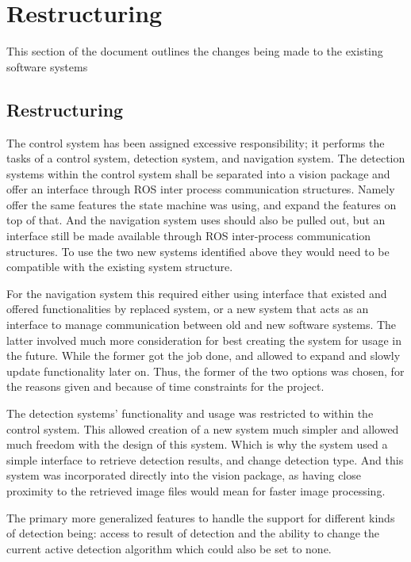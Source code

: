 
\chapter{Restructuring} %

\label{Chapter4} %

This section of the document outlines the changes being made to the existing software systems 


\section{Restructuring}


The control system has been assigned excessive responsibility; it performs the tasks of a control system, detection system, and navigation system. The detection systems within the control system shall be separated into a vision package and offer an interface through ROS inter process communication structures. Namely offer the same features the state machine was using, and expand the features on top of that. And the navigation system uses should also be pulled out, but an interface still be made available through ROS inter-process communication structures. To use the two new systems identified above they would need to be compatible with the existing system structure.

For the navigation system this required either using interface that existed and offered functionalities by replaced system, or a new system that acts as an interface to manage communication between old and new software systems. The latter involved much more consideration for best creating the system for usage in the future. While the former got the job done, and allowed to expand and slowly update functionality later on. Thus, the former of the two options was chosen, for the reasons given and because of time constraints for the project.

The detection systems' functionality and usage was restricted to within the control system. This allowed creation of a new system much simpler and allowed much freedom with the design of this system. Which is why the system used a simple interface to retrieve detection results, and change detection type. And this system was incorporated directly into the vision package, as having close proximity to the retrieved image files would mean for faster image processing.

The primary more generalized features to handle the support for different kinds of detection being: access to result of detection and the ability to change the current active detection algorithm which could also be set to none.

